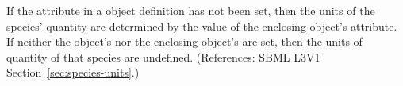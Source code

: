 If the  attribute in a \Species object definition has
not been set, then the units of the species' quantity are determined by the
value of the enclosing \Model object's  attribute.
If neither the \Species object's  nor the enclosing
\Model object's  are set, then the units of quantity
of that species are undefined.  (References: SBML L3V1
Section~\ref{sec:species-units}.)
